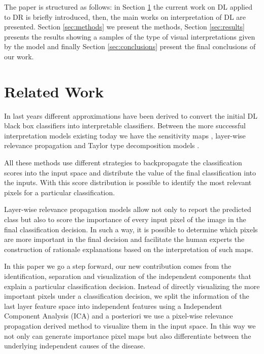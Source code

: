 \documentclass{llncs}
\begin{document}
The paper is structured as follows: in Section \ref{sec:related} the current work on DL applied to DR is briefly introduced, then, the main works on interpretation of DL are presented. Section \ref{sec:methods} we present the methods, Section \ref{sec:results} presents the results showing a samples of the type of visual interpretations given by the model and finally Section \ref{sec:conclusions} present the final conclusions of our work.

\section{Related Work}\label{sec:related}

In last years different approximations have been derived to convert the initial DL black box classifiers into interpretable classifiers. Between the more successful interpretation models existing today we have the sensitivity maps \cite{DBLP:journals/corr/SimonyanVZ13}, layer-wise relevance propagation \cite{bach2015pixel} and Taylor type decomposition models \cite{montavon2017explaining}. %

All these methods use different strategies to backpropagate the classification scores into the input space and distribute the value of the final classification into the inputs. With this score distribution is possible to identify the most relevant pixels for a particular classification. 

Layer-wise relevance propagation models allow not only to report the predicted class but also to score the importance of every input pixel of the image in the final classification decision. In such a way, it is possible to determine which pixels are more important in the final decision and facilitate the human experts the construction of rationale explanations based on the interpretation of such maps. 

In this paper we go a step forward, our new contribution comes from the identification, separation and visualization of the independent components that explain a particular classification decision. Instead of directly visualizing the more important pixels under a classification decision, we split the information of the last layer feature space into independent features using a Independent Component Analysis (ICA) and a posteriori we use a pixel-wise relevance propagation derived method to visualize them in the input space. In this way we not only can generate importance pixel maps but also differentiate between the underlying independent causes of the disease.
\end{document}
